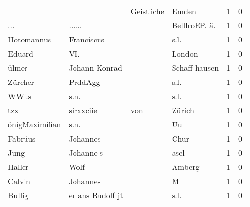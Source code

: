 \documentclass[10pt,a4paper,landscape]{article}
\begin{document}
\begin{longtable}{llllrr}
                          &                                    &  Geistliche &                                       Emden &          1 &         0 \\
                      ... &                             ...... &             &                              BelllroEP. ä.  &          1 &         0 \\
               Hotomannus &                         Franciscus &             &                                        s.l. &          1 &         0 \\
                   Eduard &                                VI. &             &                                      London &          1 &         0 \\
                    ülmer &                      Johann Konrad &             &                               Schaff hausen &          1 &         0 \\
                  Zürcher &                            PrddAgg &             &                                        s.l. &          1 &         0 \\
                    WWi.s &                               s.n. &             &                                        s.l. &          1 &         0 \\
                      tzx &                          sirxxciie &         von &                                      Zürich &          1 &         0 \\
           önigMaximilian &                               s.n. &             &                                          Uu &          1 &         0 \\
                  Fabrüus &                           Johannes &             &                                        Chur &          1 &         0 \\
                     Jung &                          Johanne s &             &                                        asel &          1 &         0 \\
                   Haller &                               Wolf &             &                                      Amberg &          1 &         0 \\
                   Calvin &                           Johannes &             &                                           M &          1 &         0 \\
                   Bullig &                   er ans Rudolf jt &             &                                        s.l. &          1 &         0 \\

\end{longtable}
\end{document}
